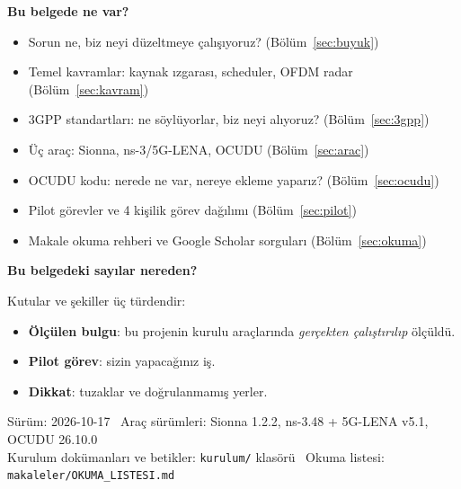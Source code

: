 \begin{titlepage}
\begin{minipage}[t]{0.62\textwidth}
\vspace{0.4cm}
\textbf{Bu belgede ne var?}
\begin{itemize}[leftmargin=1.2em]
\item Sorun ne, biz neyi düzeltmeye çalışıyoruz? (Bölüm~\ref{sec:buyuk})
\item Temel kavramlar: kaynak ızgarası, scheduler, OFDM radar (Bölüm~\ref{sec:kavram})
\item 3GPP standartları: ne söylüyorlar, biz neyi alıyoruz? (Bölüm~\ref{sec:3gpp})
\item Üç araç: Sionna, ns-3/5G-LENA, OCUDU (Bölüm~\ref{sec:arac})
\item OCUDU kodu: nerede ne var, nereye ekleme yaparız? (Bölüm~\ref{sec:ocudu})
\item Pilot görevler ve 4 kişilik görev dağılımı (Bölüm~\ref{sec:pilot})
\item Makale okuma rehberi ve Google Scholar sorguları (Bölüm~\ref{sec:okuma})
\end{itemize}
\end{minipage}\hfill
\begin{minipage}[t]{0.33\textwidth}
\vspace{0pt}
\begin{tcolorbox}[colback=accl,colframe=acc,boxrule=0.5pt,arc=3pt,left=6pt,right=6pt,top=5pt,bottom=5pt]
\sffamily\small
\textbf{Bu belgedeki sayılar nereden?}\par\vspace{2pt}
Kutular ve şekiller üç türdendir:
\begin{itemize}[leftmargin=1em,itemsep=1pt]
\item \textcolor{purp}{\textbf{Ölçülen bulgu}}: bu projenin kurulu araçlarında \emph{gerçekten çalıştırılıp} ölçüldü.
\item \textcolor{good}{\textbf{Pilot görev}}: sizin yapacağınız iş.
\item \textcolor{warn}{\textbf{Dikkat}}: tuzaklar ve doğrulanmamış yerler.
\end{itemize}
\end{tcolorbox}
\end{minipage}

\vfill
{\sffamily\small\color{muted}
Sürüm: 2026-10-17 \textbullet\ Araç sürümleri: Sionna 1.2.2, ns-3.48 + 5G-LENA v5.1, OCUDU 26.10.0\\
Kurulum dokümanları ve betikler: \texttt{kurulum/} klasörü \textbullet\ Okuma listesi: \texttt{makaleler/OKUMA\_LISTESI.md}}
\end{titlepage}

